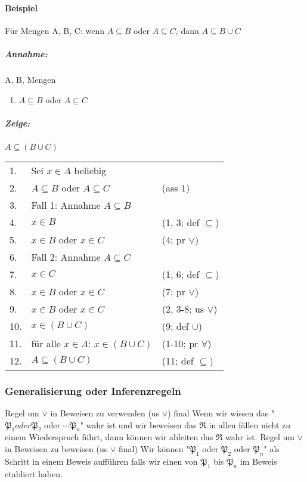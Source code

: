             \paragraph{Beispiel}
                Für Mengen A, B, C: wenn \(A \subseteq B\) oder \(A \subseteq C\), dann \(A \subseteq B \cup C\)
                \subparagraph{Annahme:}
                    A, B, Mengen
                    \begin{enumerate}
                        \item \(A \subseteq B\) oder \(A \subseteq C\)
                    \end{enumerate}
                \subparagraph{Zeige:}
                    \(A \subseteq (B \cup C)\)\\
                    \begin{tabular}{p{0.5cm}p{6cm}p{4cm}}
                        1. & Sei $x \in A$ beliebig & \\
                        2. & $A \subseteq B$ oder $A \subseteq C$ & (ass 1) \\
                        3. & Fall 1: Annahme $A \subseteq B$ & \\
                        4. & $x \in B$ & (1, 3; def $\subseteq$) \\
                        5. & $x \in B$ oder $x \in C$ & (4; pr $\lor$) \\
                        6. & Fall 2: Annahme $A \subseteq C$ & \\
                        7. & $x \in C$ & (1, 6; def $\subseteq$) \\
                        8. & $x \in B$ oder $x \in C$ & (7; pr $\lor$) \\
                        9. & $x \in B$ oder $x \in C$ & (2, 3-8; us $\lor$) \\
                        10. & $x \in (B \cup C)$ & (9; def $\cup$) \\
                        11. & für alle $x \in A$: $x \in (B \cup C)$ & (1-10; pr $\forall$) \\
                        12. & $A \subseteq (B \cup C)$ & (11; def $\subseteq$) \\
                    \end{tabular}
        \newpage
        \subsubsection{Generalisierung oder Inferenzregeln}
                {
                    Regel um \(\vee\) in Beweisen zu verwenden (us \(\vee\)) final
                }
                {
                    Wenn wir wissen das "\(\mathfrak{P}_1 oder \mathfrak{P}_2\) oder \(\cdots \mathfrak{P}_n\)" wahr ist und wir beweisen das \(\mathfrak{R}\) in allen fällen nicht zu einem Wiederspruch führt, dann können wir ableiten das \(\mathfrak{R}\) wahr ist.
                }
            {
                Regel um \(\vee\) in Beweisen zu beweisen (us \(\vee\) final)
            }
            {
                Wir können "\(\mathfrak{P}_1\) oder \(\mathfrak{P}_2\) oder \(\mathfrak{P}_n\)" als Schritt in einem Beweis aufführen falls wir einen von \(\mathfrak{P}_1\) bis \(\mathfrak{P}_n\) im Beweis etabliert haben.
            }

